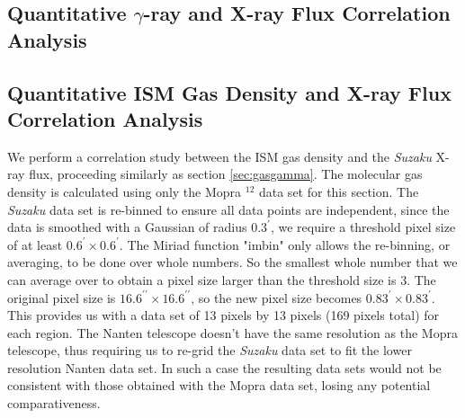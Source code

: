 \documentclass[12pt,a4paper]{article}
\begin{document}
\subsection{Quantitative $\gamma$-ray and X-ray Flux Correlation Analysis}


\subsection{Quantitative ISM Gas Density and X-ray Flux Correlation Analysis}
We perform a correlation study between the ISM gas density and the \textit{Suzaku} X-ray flux, proceeding similarly as section \ref{sec:gasgamma}. The molecular gas density is calculated using only the Mopra $^{12}$ data set for this section. The \textit{Suzaku} data set is re-binned to ensure all data points are independent, since the data is smoothed with a Gaussian of radius $0.3^{\prime}$, we require a threshold pixel size of at least $0.6^{\prime} \times 0.6^{\prime} $. The Miriad function "imbin" only allows the re-binning, or averaging, to be done over whole numbers. So the smallest whole number that we can average over to obtain a pixel size larger than the threshold size is 3. The original pixel size is $16.6^{\prime \prime} \times 16.6^{\prime \prime}$, so the new pixel size becomes $0.83^{\prime} \times 0.83^{\prime}$. This provides us with a data set of 13 pixels by 13 pixels (169 pixels total) for each region. 
The Nanten telescope doesn't have the same resolution as the Mopra telescope, thus requiring us to re-grid the \textit{Suzaku} data set to fit the lower resolution Nanten data set. In such a case the resulting data sets would not be consistent with those obtained with the Mopra data set, losing any potential comparativeness. 
\end{document}
